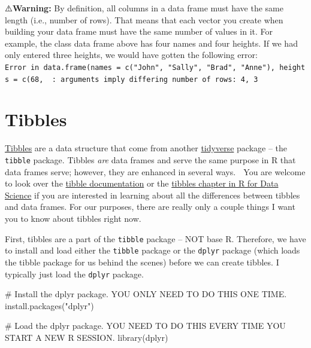 \documentclass[
  letterpaper,
  DIV=11,
  numbers=noendperiod]{scrreprt}
\newenvironment{Shaded}{\begin{snugshade}}{\end{snugshade}}
\newcommand{\CommentTok}[1]{\textcolor[rgb]{0.37,0.37,0.37}{#1}}
\newcommand{\FunctionTok}[1]{\textcolor[rgb]{0.28,0.35,0.67}{#1}}
\newcommand{\NormalTok}[1]{\textcolor[rgb]{0.00,0.23,0.31}{#1}}
\newcommand{\StringTok}[1]{\textcolor[rgb]{0.13,0.47,0.30}{#1}}
\begin{document}
⚠️\textbf{Warning:} By definition, all columns in a data frame must have
the same length (i.e., number of rows). That means that each vector you
create when building your data frame must have the same number of values
in it. For example, the class data frame above has four names and four
heights. If we had only entered three heights, we would have gotten the
following error:
\texttt{Error\ in\ data.frame(names\ =\ c("John",\ "Sally",\ "Brad",\ "Anne"),\ heights\ =\ c(68,\ \ :\ arguments\ imply\ differing\ number\ of\ rows:\ 4,\ 3}

\section{Tibbles}\label{tibbles}

\href{https://tibble.tidyverse.org/}{Tibbles} are a data structure that
come from another \href{https://www.tidyverse.org/}{tidyverse} package
-- the \texttt{tibble} package. Tibbles \emph{are} data frames and serve
the same purpose in R that data frames serve; however, they are enhanced
in several ways. 💪 You are welcome to look over the
\href{https://tibble.tidyverse.org/}{tibble documentation} or the
\href{https://r4ds.had.co.nz/tibbles.html}{tibbles chapter in R for Data
Science} if you are interested in learning about all the differences
between tibbles and data frames. For our purposes, there are really only
a couple things I want you to know about tibbles right now.

First, tibbles are a part of the \texttt{tibble} package -- NOT base R.
Therefore, we have to install and load either the \texttt{tibble}
package or the \texttt{dplyr} package (which loads the tibble package
for us behind the scenes) before we can create tibbles. I typically just
load the \texttt{dplyr} package.

\begin{Shaded}
\begin{Highlighting}[]
\CommentTok{\# Install the dplyr package. YOU ONLY NEED TO DO THIS ONE TIME.}
\FunctionTok{install.packages}\NormalTok{(}\StringTok{"dplyr"}\NormalTok{)}
\end{Highlighting}
\end{Shaded}

\begin{Shaded}
\begin{Highlighting}[]
\CommentTok{\# Load the dplyr package. YOU NEED TO DO THIS EVERY TIME YOU START A NEW R SESSION.}
\FunctionTok{library}\NormalTok{(dplyr)}
\end{Highlighting}
\end{Shaded}
\end{document}
